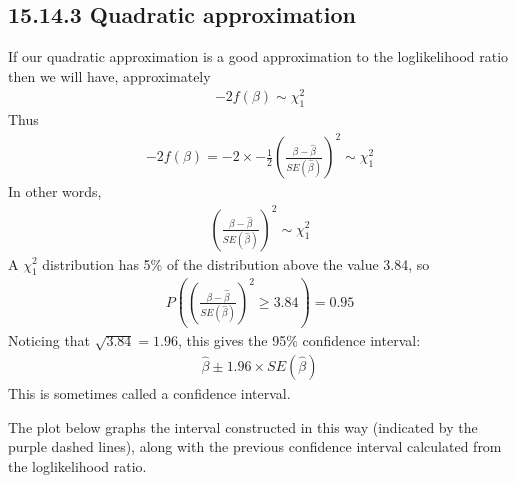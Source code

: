 \documentclass[letterpaper,10pt,english]{jupyterBook}
\begin{document}
\subsection{15.14.3 Quadratic approximation}
\label{\detokenize{15.m. Logistic Regression:id1}}
\sphinxAtStartPar
If our quadratic approximation is a good approximation to the log\sphinxhyphen{}likelihood ratio then we will have, approximately
\begin{equation*}
\begin{split}
-2 f(\beta) \sim \chi^2_1
\end{split}
\end{equation*}
\sphinxAtStartPar
Thus
\begin{equation*}
\begin{split}
-2 f(\beta) = -2 \times -\frac{1}{2} \left( \frac{\beta - \hat{\beta}}{SE(\hat{\beta})} \right)^2  \sim \chi^2_1
\end{split}
\end{equation*}
\sphinxAtStartPar
In other words,
\begin{equation*}
\begin{split}
\left( \frac{\beta - \hat{\beta}}{SE(\hat{\beta})} \right)^2  \sim \chi^2_1
\end{split}
\end{equation*}
\sphinxAtStartPar
A \(\chi^2_1\) distribution has 5\% of the distribution above the value 3.84, so
\begin{equation*}
\begin{split}
P\left(\left( \frac{\beta - \hat{\beta}}{SE(\hat{\beta})} \right)^2  \geq 3.84\right)  = 0.95
\end{split}
\end{equation*}
\sphinxAtStartPar
Noticing that \(\sqrt{3.84} = 1.96\), this gives the 95\% confidence interval:
\begin{equation*}
\begin{split}
\hat{\beta} \pm 1.96 \times SE(\hat{\beta})
\end{split}
\end{equation*}
\sphinxAtStartPar
This is sometimes called a  confidence interval.

\sphinxAtStartPar
The plot below graphs the interval constructed in this way (indicated by the purple dashed lines), along with the previous  confidence interval calculated from the log\sphinxhyphen{}likelihood ratio.

\noindent{}
\end{document}
